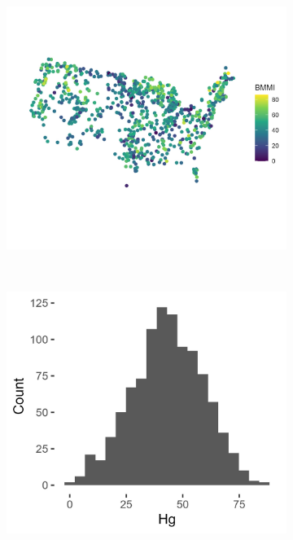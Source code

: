 \documentclass[]{elsarticle} %
\begin{document}
\begin{figure}
\centering
\begin{subfigure}{0.98\textwidth}
  \centering
  \includegraphics[width = 1\linewidth]{figures/bmmi_map.jpeg}
  \caption*{}
  \label{fig:bmmi_map}
\end{subfigure} \\
\begin{subfigure}{0.49\textwidth}
  \centering
  \includegraphics[width = 1\linewidth]{figures/bmmi_hist.jpeg}

\end{subfigure}
\end{figure}
\end{document}
